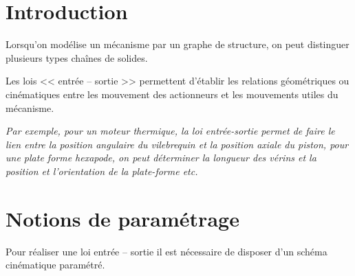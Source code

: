 \def\xxactivite{Cours}
\def\xxauteur{\textsl{Xavier Pessoles}}

\fichetrue
\proftrue
\tdfalse
\coursfalse


\def\xxcompetences{%
\textsl{%
\textbf{Savoirs et compétences :}\\
\begin{itemize}[label=\ding{112},font=\color{ocre}] 
\item **\textit{Mod2.C1 : }Chaîne d’énergie et d'information
\end{itemize}
}}

\def\xxfigures{
\\
}%


\iflivret

\else

\fi
\setlength{\columnseprule}{.1pt}

\vspace{2cm}
\pagestyle{fancy}
\thispagestyle{plain}



\setcounter{section}{0}
\section{Introduction}
\begin{defi}
Lorsqu'on modélise un mécanisme par un graphe de structure, on peut distinguer plusieurs types chaînes de solides.


Les lois << entrée -- sortie >> permettent d'établir les relations géométriques ou cinématiques entre les mouvement des actionneurs et les mouvements utiles du mécanisme. 

\textit{Par exemple, pour un moteur thermique, la loi entrée-sortie permet de faire le lien entre la position angulaire du vilebrequin et la position axiale du piston, pour une plate forme hexapode, on peut déterminer la longueur des vérins et la position et l'orientation de la plate-forme \textit{etc.}}
\end{defi}

\section{Notions de paramétrage}
Pour réaliser une loi entrée -- sortie il est nécessaire de disposer d'un schéma cinématique paramétré.
